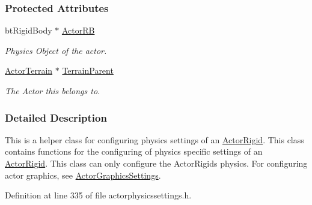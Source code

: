 \subsubsection*{Protected Attributes}
\begin{DoxyCompactItemize}
\item 
\hypertarget{classphys_1_1ActorTerrainPhysicsSettings_a5b6aa0ee76eb72faeb4cb08102e225b8}{
btRigidBody $\ast$ \hyperlink{classphys_1_1ActorTerrainPhysicsSettings_a5b6aa0ee76eb72faeb4cb08102e225b8}{ActorRB}}
\label{classphys_1_1ActorTerrainPhysicsSettings_a5b6aa0ee76eb72faeb4cb08102e225b8}

\begin{DoxyCompactList}\small\item\em Physics Object of the actor. \item\end{DoxyCompactList}\item 
\hypertarget{classphys_1_1ActorTerrainPhysicsSettings_a213df216c2804c25a9a2e7f10e8c58ed}{
\hyperlink{classphys_1_1ActorTerrain}{ActorTerrain} $\ast$ \hyperlink{classphys_1_1ActorTerrainPhysicsSettings_a213df216c2804c25a9a2e7f10e8c58ed}{TerrainParent}}
\label{classphys_1_1ActorTerrainPhysicsSettings_a213df216c2804c25a9a2e7f10e8c58ed}

\begin{DoxyCompactList}\small\item\em The Actor this belongs to. \item\end{DoxyCompactList}\end{DoxyCompactItemize}


\subsubsection{Detailed Description}
This is a helper class for configuring physics settings of an \hyperlink{classphys_1_1ActorRigid}{ActorRigid}. This class contains functions for the configuring of physics specific settings of an \hyperlink{classphys_1_1ActorRigid}{ActorRigid}. This class can only configure the ActorRigids physics. For configuring actor graphics, see \hyperlink{classphys_1_1ActorGraphicsSettings}{ActorGraphicsSettings}. 

Definition at line 335 of file actorphysicssettings.h.



